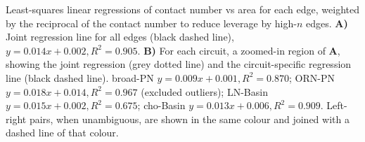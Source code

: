 Least-squares linear regressions of contact number vs area for each edge, weighted by the reciprocal of the contact number to reduce leverage by high-$n$ edges.
\textbf{A)} Joint regression line for all edges (black dashed line), $y = 0.014x + 0.002, R^2 = 0.905$.
\textbf{B)} For each circuit, a zoomed-in region of \textbf{A}, showing the joint regression (grey dotted line) and the circuit-specific regression line (black dashed line).
broad-PN $y = 0.009x + 0.001, R^2 = 0.870$;
ORN-PN $y = 0.018x + 0.014, R^2 = 0.967$ (\dagger excluded outliers);
LN-Basin $y = 0.015x + 0.002, R^2 = 0.675$;
cho-Basin $y = 0.013x + 0.006, R^2 = 0.909$.
Left-right pairs, when unambiguous, are shown in the same colour and joined with a dashed line of that colour.